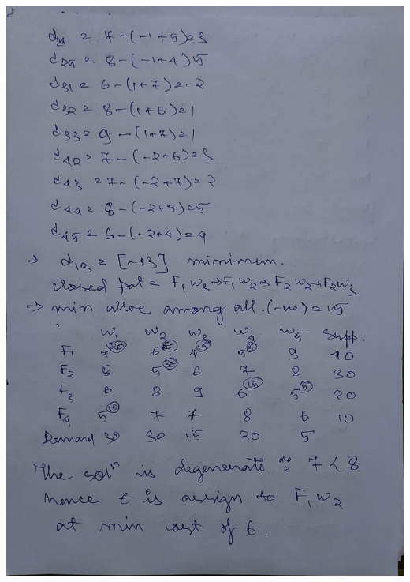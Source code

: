 \documentclass[12pt, letterpaper, twoside]{book}
\begin{document}
\includegraphics[width=\paperwidth, height=\paperheight]{Page15}
\end{document}
